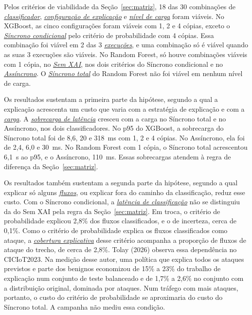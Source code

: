 \documentclass[
  12pt,
  oneside,
  a4paper,
  chapter=TITLE,
  sumario=tradicional,
  english,
  brazil
]{abntex2}
\newcommand{\termo}[2]{\hyperref[gl:#1]{\emph{#2}}}
\begin{document}
Pelos critérios de viabilidade da Seção~\ref{sec:matriz}, 18 das 30 combinações de
\termo{classificador}{classificador}, \termo{configuracao}{configuração de explicação} e \termo{nivel-carga}{nível de
carga} foram viáveis. No XGBoost, as cinco configurações foram viáveis com 1, 2 e 4 cópias, exceto o
\termo{sincrono-condicional}{Síncrono condicional} pelo critério de probabilidade com 4 cópias. Essa
combinação foi viável em 2 das 3 \termo{execucao}{execuções}, e uma combinação só é viável quando as
suas 3 execuções são viáveis. No Random Forest, só houve combinações viáveis com 1 cópia, no
\termo{sem-xai}{Sem XAI}, nos dois critérios do Síncrono condicional e no
\termo{assincrono}{Assíncrono}. O \termo{sincrono-total}{Síncrono total} do Random Forest não foi
viável em nenhum nível de carga.

Os resultados sustentam a primeira parte da hipótese, segundo a qual a explicação acrescenta um
custo que varia com a estratégia de explicação e com a \termo{carga}{carga}. A
\termo{sobrecarga}{sobrecarga de latência} cresceu com a carga no Síncrono total e no Assíncrono, nos
dois classificadores. No p95 do XGBoost, a sobrecarga do Síncrono total foi de 8,6, 20 e 318~ms com
1, 2 e 4 cópias. No Assíncrono, ela foi de 2,4, 6,0 e 30~ms. No Random Forest com 1 cópia, o
Síncrono total acrescentou 6,1~s ao p95, e o Assíncrono, 110~ms. Essas sobrecargas atendem à regra
de diferença da Seção~\ref{sec:matriz}.

Os resultados também sustentam a segunda parte da hipótese, segundo a qual explicar só alguns
\termo{fluxo}{fluxos}, ou explicar fora do caminho da classificação, reduz esse custo. Com o
Síncrono condicional, a \termo{latencia-classificacao}{latência de classificação} não se distinguiu
da do Sem XAI pela regra da Seção~\ref{sec:matriz}. Em troca, o critério de probabilidade explicou
2,8\% dos fluxos classificados, e o de incerteza, cerca de 0,1\%. Como o
critério de probabilidade explica os fluxos classificados como ataque, a
\termo{cobertura-explicativa}{cobertura explicativa} desse critério acompanha a proporção de fluxos
de ataque do trecho, de cerca de 2,8\%. Tolay (2026) observa essa dependência no CICIoT2023. Na
medição desse autor, uma política que explica todos os ataques previstos e parte dos benignos
economizou de 15\% a 23\% do trabalho de explicação num conjunto de teste balanceado e de 1,7\% a
2,6\% no conjunto com a distribuição original, dominada por ataques. Num tráfego com mais ataques,
portanto, o custo do critério de probabilidade se aproximaria do custo do Síncrono total. A campanha
não mediu essa condição.
\end{document}
